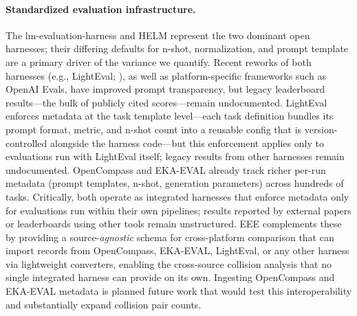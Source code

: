 \documentclass[11pt]{article}
\begin{document}
\paragraph{Standardized evaluation infrastructure.}
The lm-evaluation-harness \citep{gao-2021-framework} and HELM
\citep{liang-2022-holistic} represent the two dominant open harnesses;
their differing defaults for n-shot, normalization, and prompt template
are a primary driver of the variance we quantify.
Recent reworks of both harnesses (e.g., LightEval;
\citealt{fourrier-2024-lighteval}), as well as platform-specific
frameworks such as OpenAI Evals, have improved prompt transparency,
but legacy leaderboard results---the bulk of publicly cited
scores---remain undocumented.
LightEval enforces metadata at the task template level---each task
definition bundles its prompt format, metric, and n-shot count into
a reusable config that is version-controlled alongside the harness
code---but this enforcement applies only to evaluations run with
LightEval itself; legacy results from other harnesses remain
undocumented.
OpenCompass \citep{contributors-2023-opencompass} and
EKA-EVAL \citep{kim-2025-ekaeval} already track richer per-run
metadata (prompt templates, n-shot, generation parameters) across
hundreds of tasks.
Critically, both operate as integrated harnesses that enforce
metadata only for evaluations run within their own pipelines;
results reported by external papers or leaderboards using other
tools remain unstructured.
EEE complements these by providing a source-\emph{agnostic} schema
for cross-platform comparison that can import records from
OpenCompass, EKA-EVAL, LightEval, or any other harness via
lightweight converters, enabling the cross-source collision analysis
that no single integrated harness can provide on its own.
Ingesting OpenCompass and EKA-EVAL metadata is planned future work
that would test this interoperability and substantially expand
collision pair counts.
\end{document}
